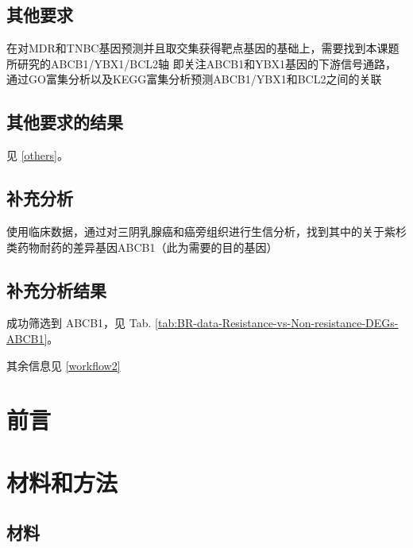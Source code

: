 \documentclass[
]{article}
\begin{document}
\hypertarget{ux5176ux4ed6ux8981ux6c42}{%
\subsection{其他要求}\label{ux5176ux4ed6ux8981ux6c42}}

在对MDR和TNBC基因预测并且取交集获得靶点基因的基础上，需要找到本课题所研究的ABCB1/YBX1/BCL2轴
即关注ABCB1和YBX1基因的下游信号通路，通过GO富集分析以及KEGG富集分析预测ABCB1/YBX1和BCL2之间的关联

\hypertarget{ux5176ux4ed6ux8981ux6c42ux7684ux7ed3ux679c}{%
\subsection{其他要求的结果}\label{ux5176ux4ed6ux8981ux6c42ux7684ux7ed3ux679c}}

见 \ref{others}。

\hypertarget{ux8865ux5145ux5206ux6790}{%
\subsection{补充分析}\label{ux8865ux5145ux5206ux6790}}

使用临床数据，通过对三阴乳腺癌和癌旁组织进行生信分析，找到其中的关于紫杉类药物耐药的差异基因ABCB1（此为需要的目的基因）

\hypertarget{ux8865ux5145ux5206ux6790ux7ed3ux679c}{%
\subsection{补充分析结果}\label{ux8865ux5145ux5206ux6790ux7ed3ux679c}}

成功筛选到 ABCB1，见 Tab. \ref{tab:BR-data-Resistance-vs-Non-resistance-DEGs-ABCB1}。

其余信息见 \ref{workflow2}

\hypertarget{introduction}{%
\section{前言}\label{introduction}}

\hypertarget{methods}{%
\section{材料和方法}\label{methods}}

\hypertarget{ux6750ux6599}{%
\subsection{材料}\label{ux6750ux6599}}
\end{document}
